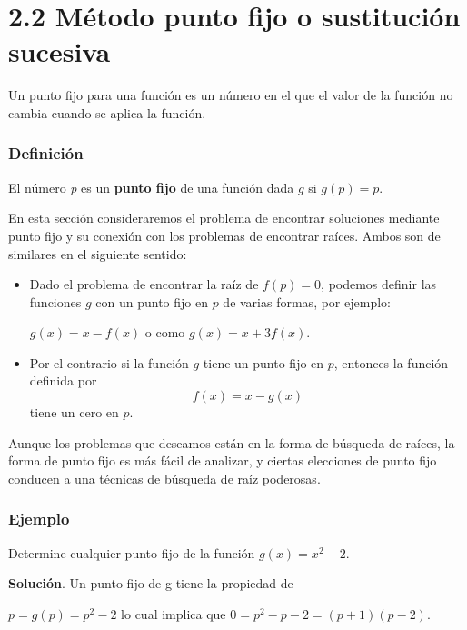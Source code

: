 \section*{2.2 Método punto fijo o sustitución sucesiva}

Un punto fijo para una función es un número en el que el valor de la función no cambia cuando se aplica la función.
\\

\begin{tcolorbox}[colback=gray!5!]
\subsubsection*{Definición}
El número \textit{p} es un \textbf{punto fijo} de una función dada $g$ si $g(p)=p$.
\end{tcolorbox}

En esta sección consideraremos el problema de encontrar soluciones mediante punto fijo y su conexión con los problemas de encontrar raíces. Ambos son de similares en el siguiente sentido:

\begin{itemize}
    \item Dado el problema de encontrar la raíz de $f(p)=0$, podemos definir las funciones $g$  con un punto fijo en $p$ de varias formas, por ejemplo: 
    \begin{center}
        $g(x)=x-f(x)$ o como $g(x)=x +3f(x)$.
    \end{center}
    \item Por el contrario si la función $g$ tiene un punto fijo en $p$, entonces la función definida por 
    \begin{equation*}
        f(x)=x-g(x)
    \end{equation*}
    tiene un cero en $p$.
\end{itemize}

Aunque los problemas que deseamos están en la forma de búsqueda de raíces, la forma de punto fijo es más fácil de analizar, y ciertas elecciones de punto fijo conducen a una técnicas de búsqueda de raíz poderosas.

\subsubsection*{Ejemplo}
Determine cualquier punto fijo de la función $g(x)=x^2-2$.

\textbf{Solución}. Un punto fijo de g tiene la propiedad de 
\begin{center}
    $p=g(p)=p^2-2$ lo cual implica que $0=p^2-p-2=(p+1)(p-2)$.
\end{center}

